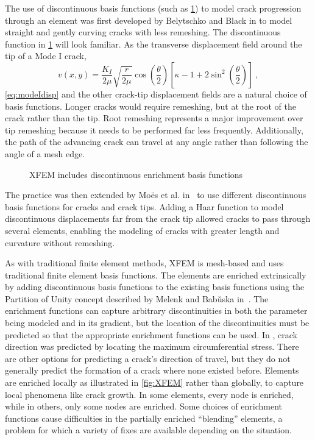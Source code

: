 The use of discontinuous basis functions (such as \cref{fig:CrackEnrich}) to model crack progression through an element was first developed by Belytschko and Black in \cite{belytschko1999elastic} to model straight and gently curving cracks with less remeshing.
The discontinuous function in \cref{fig:CrackEnrich} will look familiar.
As the transverse displacement field around the tip of a Mode I crack,
\begin{equation}
\label{eq:modeIdisp}
v(x,y)=\frac{K_I}{2\mu}\sqrt{\frac{r}{2\mu}}\cos\left(\frac{\theta}{2}\right)\left[\kappa-1+2\sin^2\left(\frac{\theta}{2}\right)\right]\, ,
\end{equation}
\cref{eq:modeIdisp} and the other crack-tip displacement fields are a natural choice of basis functions.
Longer cracks would require remeshing, but at the root of the crack rather than the tip.
Root remeshing represents a major improvement over tip remeshing because it needs to be performed far less frequently.
Additionally, the path of the advancing crack can travel at any angle rather than following the angle of a mesh edge.
\begin{figure}[h]
  \centering
  \scalebox{.55}{}
  \caption{XFEM includes discontinuous enrichment basis functions}
  \label{fig:CrackEnrich}
\end{figure}
The practice was then extended by Mo\"es et al. in~\cite{dolbow1999finite} to use different discontinuous basis functions for cracks and crack tips.
Adding a Haar function to model discontinuous displacements far from the crack tip allowed cracks to pass through several elements, enabling the modeling of cracks with greater length and curvature without remeshing.

As with traditional finite element methods, XFEM is mesh-based and uses traditional finite element basis functions.
The elements are enriched extrinsically by adding discontinuous basis functions to the existing basis functions using the Partition of Unity concept described by Melenk and Bab\v{u}ska in~\cite{melenk1996partition}.
The enrichment functions can capture arbitrary discontinuities in both the parameter being modeled and in its gradient, but the location of the discontinuities must be predicted so that the appropriate enrichment functions can be used.
In \cite{dolbow1999finite}, crack direction was predicted by locating the maximum circumferential stress.
There are other options for predicting a crack's direction of travel, but they do not generally predict the formation of a crack where none existed before.
Elements are enriched locally as illustrated in \cref{fig:XFEM} rather than globally, to capture local phenomena like crack growth.
In some elements, every node is enriched, while in others, only some nodes are enriched.
Some choices of enrichment functions cause difficulties in the partially enriched ``blending'' elements, a problem for which a variety of fixes are available depending on the situation.



